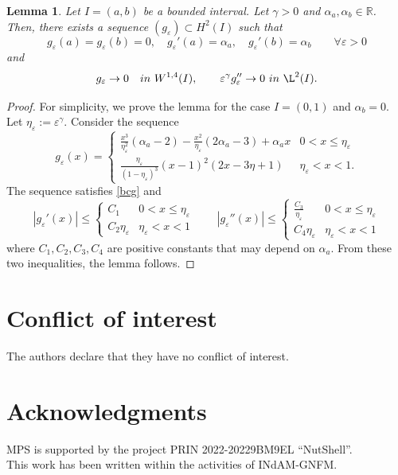 \documentclass[a4, 11pt, reqno, final]{amsart}
\newcommand{\bbR}{\mathbb{R}}
\newcommand\e{\varepsilon}
\theoremstyle{plain}%
\newtheorem{lemma}[theorem]{Lemma}
\newcommand{\QED}{\hspace{1ex}\hfill$\blacksquare$\vspace{2ex}}
\begin{document}
	\begin{lemma}\label{lemmaa7}
		Let $I=(a,b)$ be a bounded interval. Let $\gamma > 0$ and $\alpha_a, \alpha_b \in \bbR$. Then, there exists a sequence $(g_\e) \subset H^2(I)$ such that
		\begin{equation}\label{bcg}
			g_\e(a) = g_\e(b) = 0, \quad g_\e'(a)=\alpha_a, \quad g_\e'(b)=\alpha_b \qquad \forall \e > 0\end{equation}
		and
		$$ g_\e \to 0 \quad in \ W^{1,4}(I), \qquad \e^\gamma g_\e'' \to 0 \ in \ \L^2(I). $$
	\end{lemma}
	\begin{proof}
		For simplicity, we prove the lemma for the case $I=(0,1)$ and $\alpha_b=0$. Let $\eta_\e := \e^{\gamma}$.
		Consider the sequence
		$$ g_\e(x) = \begin{cases}
			\frac{x^3}{\eta_\e^2}(\alpha_a-2) - \frac{x^2}{\eta_\e}(2\alpha_a-3) + \alpha_a x & 0<x\leq\eta_\e \\
			\frac{\eta_\e}{(1-\eta_\e)^3}(x-1)^2(2x-3\eta+1) & \eta_\e < x<1.
		\end{cases}$$
		The sequence satisfies \eqref{bcg} and
		$$ |g_\e'(x)|\leq \begin{cases}
			C_1 &  0<x\leq\eta_\e \\
			C_2 \eta_\e & \eta_\e < x<1
		\end{cases} \qquad |g_\e''(x)|\leq \begin{cases}
			\frac{C_3}{\eta_\e} &  0<x\leq\eta_\e \\
			C_4 \eta_\e & \eta_\e < x<1
		\end{cases}$$
		where $C_1, C_2, C_3, C_4$ are positive constants that may depend on $\alpha_a$.
		From these two inequalities, the lemma follows.
	\end{proof}


	\section*{Conflict of interest}
	The authors declare that they have no conflict of interest.


	\section*{Acknowledgments}
	MPS is supported by the project PRIN 2022-20229BM9EL “NutShell”.\\
	This work has been written within the activities of INdAM-GNFM.

\end{document}
